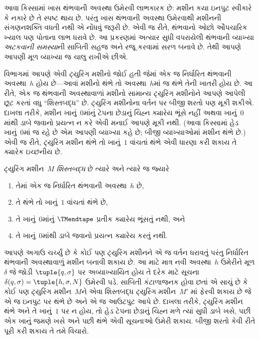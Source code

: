 \begin{explain}
આવા કિસ્સામાં ખાસ થંભવાની અવસ્થા ઉમેરવી લાભકારક છે:
મશીન કયા ઇનપુટ સ્વીકારે કે નકારે છે તે સ્પષ્ટ થાય છે.
પરંતુ ખાસ થંભવાની અવસ્થા ઉમેરવાથી મશીનની સંગણનશક્તિ
વધતી નથી એ નોંધવું જરૂરી છે. એવી જ રીતે, થંભવાનો
ઓછો ઔપચારિક ખ્યાલ પણ પોતાના લાભ ધરાવે છે. આ
પ્રકરણમાં અત્યાર સુધી વપરાયેલી થંભવાની વ્યાખ્યા
\emph{અટકવાની સમસ્યા}ની સાબિતી સહજ અને રજૂ કરવામાં
સરળ બનાવે છે. તેથી આપણે આપણી મૂળ વ્યાખ્યા જ
ચાલુ રાખીએ છીએ.
\end{explain}
\endgroup


\begingroup
\makeatletter{}\makeatother

\label{guunit:OLP-0260}


\begin{explain}
 વિભાગમાં આપણે એવી ટ્યુરિંગ મશીનો
જોઈ હતી જેમાં એક જ નિર્ધારિત થંભવાની અવસ્થા~$h$
હોય છે---આવાં મશીનો થંભે તો અવસ્થા~$h$માં જ થંભે
તેની ખાતરી હોય છે. આ રીતે, એક જ થંભવાની અવસ્થાવાળાં
મશીનો સામાન્ય ટ્યુરિંગ મશીનોને આપણે આપેલી છૂટ કરતાં
વધુ ``શિસ્તબદ્ધ'' છે. ટ્યુરિંગ મશીનોના વર્તન પર બીજી
શરતો પણ મૂકી શકીએ. દાખલા તરીકે, મશીન ખાનું~$0$માંનું
ટેપના છેડાનું ચિહ્ન ક્યારેય ભૂંસે નહીં અથવા ખાનું~$0$માંથી
ડાબે જવાનો પ્રયત્ન ન કરે એવી મનાઈ આપણે મૂકી નથી.
(આવા કિસ્સામાં હેડ ખાનું~$0$માં જ રહે છે એમ આપણી
વ્યાખ્યા કહે છે; બીજી વ્યાખ્યાઓમાં મશીન થંભે છે.)
એવી જ રીતે, ટ્યુરિંગ મશીન થંભે તો ખાનું~$1$ વાંચતાં
થંભે એવી ધારણા કરી શકાય તે ક્યારેક ઇચ્છનીય છે.
\end{explain}

\begin{defn}
ટ્યુરિંગ મશીન~$M$ \emph{શિસ્તબદ્ધ} છે ત્યારે અને
ત્યારે જ જ્યારે
\begin{enumerate}
    \item તેમાં એક જ નિર્ધારિત થંભવાની અવસ્થા~$h$ છે,
    \item તે થંભે તો ખાનું~$1$ વાંચતાં થંભે છે,
    \item તે ખાનું~$0$માંનું $\TMendtape$ પ્રતીક ક્યારેય
    ભૂંસતું નથી, અને
    \item તે ખાનું~$0$માંથી ડાબે જવાનો પ્રયત્ન ક્યારેય
    કરતું નથી.
\end{enumerate}
\end{defn}

\begin{explain}
આપણે અગાઉ ચર્ચ્યું છે કે કોઈ પણ ટ્યુરિંગ મશીનને એ જ
વર્તન ધરાવતું પરંતુ નિર્ધારિત થંભવાની અવસ્થાવાળું મશીન
બનાવી શકાય છે. આ માટે માત્ર નવી અવસ્થા~$h$ ઉમેરીને
મૂળ $\delta$ જે જોડી $\tuple{q,\sigma}$ પર અવ્યાખ્યાયિત
હોય તે દરેક માટે સૂચના
$\delta(q, \sigma) = \tuple{h, \sigma, N}$ ઉમેરવી પડે.
સાબિતી કંટાળાજનક હોવા છતાં એ સાચું છે કે કોઈ પણ
ટ્યુરિંગ મશીન~$M$ને એવા શિસ્તબદ્ધ ટ્યુરિંગ મશીન~$M'$
માં ફેરવી શકાય છે જે એ જ ઇનપુટ પર થંભે છે અને એ જ
આઉટપુટ આપે છે. દાખલા તરીકે, ટ્યુરિંગ મશીન થંભે અને
તે ખાનું~$1$ પર ન હોય, તો હેડ ટેપના છેડાનું ચિહ્ન
મળે ત્યાં સુધી ડાબે ખસે, પછી એક ખાનું જમણે ખસે અને
પછી થંભે એવી સૂચનાઓ ઉમેરી શકાય. બીજી શરતો કેવી
રીતે પૂરી કરી શકાય તે તમે વિચારો.
\end{explain}

